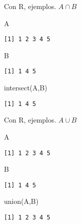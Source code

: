 \documentclass[
  ignorenonframetext,
  aspectratio=169]{beamer}
\newenvironment{Shaded}{\begin{snugshade}}{\end{snugshade}}
\newcommand{\FunctionTok}[1]{\textcolor[rgb]{0.28,0.35,0.67}{#1}}
\newcommand{\NormalTok}[1]{\textcolor[rgb]{0.00,0.23,0.31}{#1}}
\begin{document}
\begin{frame}[fragile]{Con R, ejemplos.}
\protect\hypertarget{con-r-ejemplos.-2}{}
\(A\cap B\)

\begin{Shaded}
\begin{Highlighting}[]
\NormalTok{A}
\end{Highlighting}
\end{Shaded}

\begin{verbatim}
[1] 1 2 3 4 5
\end{verbatim}

\begin{Shaded}
\begin{Highlighting}[]
\NormalTok{B}
\end{Highlighting}
\end{Shaded}

\begin{verbatim}
[1] 1 4 5
\end{verbatim}

\begin{Shaded}
\begin{Highlighting}[]
\FunctionTok{intersect}\NormalTok{(A,B)}
\end{Highlighting}
\end{Shaded}

\begin{verbatim}
[1] 1 4 5
\end{verbatim}
\end{frame}

\begin{frame}[fragile]{Con R, ejemplos.}
\protect\hypertarget{con-r-ejemplos.-3}{}
\(A\cup B\)

\begin{Shaded}
\begin{Highlighting}[]
\NormalTok{A}
\end{Highlighting}
\end{Shaded}

\begin{verbatim}
[1] 1 2 3 4 5
\end{verbatim}

\begin{Shaded}
\begin{Highlighting}[]
\NormalTok{B}
\end{Highlighting}
\end{Shaded}

\begin{verbatim}
[1] 1 4 5
\end{verbatim}

\begin{Shaded}
\begin{Highlighting}[]
\FunctionTok{union}\NormalTok{(A,B)}
\end{Highlighting}
\end{Shaded}

\begin{verbatim}
[1] 1 2 3 4 5
\end{verbatim}
\end{frame}
\end{document}
